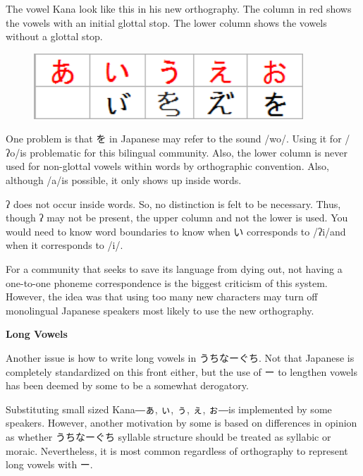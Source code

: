 \par{ The vowel Kana look like this in his new orthography. The column in red shows the vowels with an initial glottal stop. The lower column shows the vowels without a glottal stop. }
 
\begin{figure}[h]
\centering

\includegraphics[width=0.9\textwidth]{figs/第10章/第412課:_okinawanscript_fig/20110206_a2.png}

\end{figure}

\par{ One problem is that を in Japanese may refer to the sound \slash wo\slash . Using it for \slash ʔo\slash  is problematic for this bilingual community. Also, the lower column is never used for non-glottal vowels within words by orthographic convention. Also, although \slash a\slash  is possible, it only shows up inside words. }

\par{ ʔ does not occur inside words. So, no distinction is felt to be necessary. Thus, though ʔ may not be present, the upper column and not the lower is used. You would need to know word boundaries to know when い corresponds to \slash ʔi\slash  and when it corresponds to \slash i\slash . }

\par{ For a community that seeks to save its language from dying out, not having a one-to-one phoneme correspondence is the biggest criticism of this system. However, the idea was that using too many new characters may turn off monolingual Japanese speakers most likely to use the new orthography. }

\begin{center}
\textbf{Long Vowels }
\end{center}

\par{ Another issue is how to write long vowels in うちなーぐち. Not that Japanese is completely standardized on this front either, but the use of ー to lengthen vowels has been deemed by some to be a somewhat derogatory. }

\par{ Substituting small sized Kana―ぁ, ぃ, ぅ, ぇ, ぉ―is implemented by some speakers. However, another motivation by some is based on differences in opinion as whether うちなーぐち syllable structure should be treated as syllabic or moraic. Nevertheless, it is most common regardless of orthography to represent long vowels with ー. }
      
